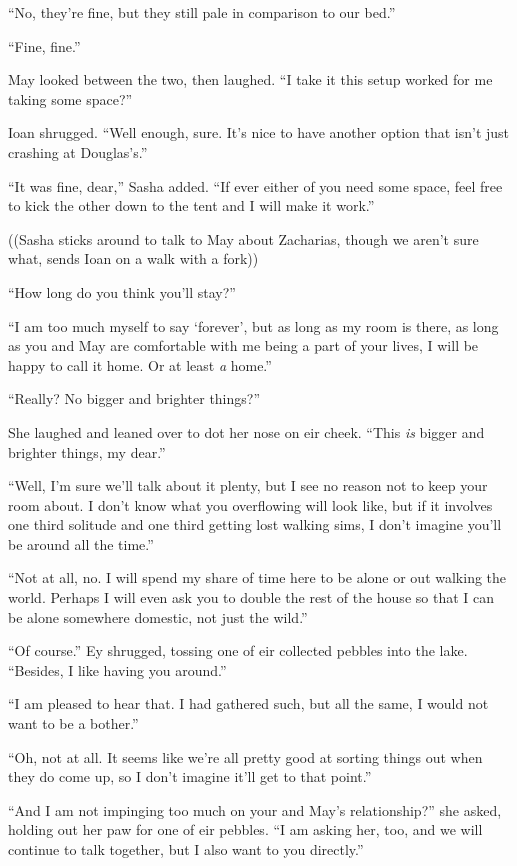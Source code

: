 ``No, they're fine, but they still pale in comparison to our bed.''

``Fine, fine.''

May looked between the two, then laughed. ``I take it this setup worked for me taking some space?''

Ioan shrugged. ``Well enough, sure. It's nice to have another option that isn't just crashing at Douglas's.''

``It was fine, dear,'' Sasha added. ``If ever either of you need some space, feel free to kick the other down to the tent and I will make it work.''

((Sasha sticks around to talk to May about Zacharias, though we aren't sure what, sends Ioan on a walk with a fork))

``How long do you think you'll stay?''

``I am too much myself to say `forever', but as long as my room is there, as long as you and May are comfortable with me being a part of your lives, I will be happy to call it home. Or at least \emph{a} home.''

``Really? No bigger and brighter things?''

She laughed and leaned over to dot her nose on eir cheek. ``This \emph{is} bigger and brighter things, my dear.''

``Well, I'm sure we'll talk about it plenty, but I see no reason not to keep your room about. I don't know what you overflowing will look like, but if it involves one third solitude and one third getting lost walking sims, I don't imagine you'll be around all the time.''

``Not at all, no. I will spend my share of time here to be alone or out walking the world. Perhaps I will even ask you to double the rest of the house so that I can be alone somewhere domestic, not just the wild.''

``Of course.'' Ey shrugged, tossing one of eir collected pebbles into the lake. ``Besides, I like having you around.''

``I am pleased to hear that. I had gathered such, but all the same, I would not want to be a bother.''

``Oh, not at all. It seems like we're all pretty good at sorting things out when they do come up, so I don't imagine it'll get to that point.''

``And I am not impinging too much on your and May's relationship?'' she asked, holding out her paw for one of eir pebbles. ``I am asking her, too, and we will continue to talk together, but I also want to you directly.''

